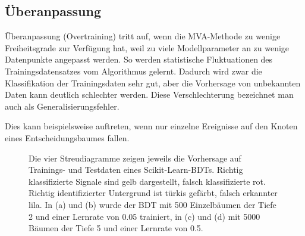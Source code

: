 
\subsection{\"Uberanpassung}
\label{ch:Algorithmen:subsec:overtraining}

\"Uberanpassung (Overtraining) tritt auf, wenn die MVA-Methode zu wenige Freiheitsgrade zur Verf\"ugung hat, weil zu viele Modellparameter an zu wenige Datenpunkte angepasst werden. So werden statistische Fluktuationen des Trainingsdatensatzes vom Algorithmus gelernt. Dadurch wird zwar die Klassifikation der Trainingsdaten sehr gut, aber die Vorhersage von unbekannten Daten kann deutlich schlechter werden. Diese Verschlechterung bezeichnet man auch als Generalisierungsfehler.

Dies kann beispielsweise auftreten, wenn nur einzelne Ereignisse auf den Knoten eines Entscheidungsbaumes fallen.\\

\begin{figure}[tbp]
\centering     %
{}
\parbox[b]{12cm}{
\caption{Die vier Streudiagramme zeigen jeweils die Vorhersage auf Trainings- und Testdaten eines Scikit-Learn-BDTs. Richtig klassifizierte Signale sind gelb dargestellt, falsch klassifizierte rot. Richtig identifizierter Untergrund ist t\"urkis gef\"arbt, falsch erkannter lila. In (a) und (b) wurde der BDT mit \num{500} Einzelb\"aumen der Tiefe \num{2} und einer Lernrate von \num{0,05} trainiert, in (c) und (d) mit \num{5000} B\"aumen der Tiefe \num{5} und einer Lernrate von \num{0,5}.}
}
\label{fig:boosting}
\end{figure}

